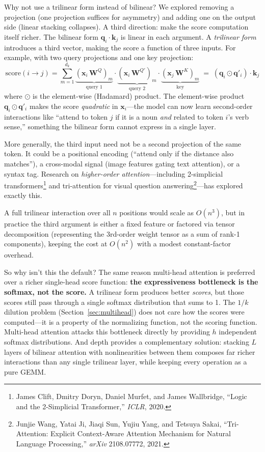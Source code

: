 \begin{whynotbox}{Why not use a trilinear form instead of bilinear?}
We explored removing a projection (one projection suffices for asymmetry) and adding one on the output side (linear stacking collapses). A third direction: make the score computation itself richer. The bilinear form $\mathbf{q}_i \cdot \mathbf{k}_j$ is linear in each argument. A \emph{trilinear form} introduces a third vector, making the score a function of three inputs. For example, with two query projections and one key projection:
\[
\text{score}(i \to j) = \sum_{m=1}^{d_k} \underbrace{(\mathbf{x}_i\, \mathbf{W}^Q)_m}_{\text{query 1}} \cdot \underbrace{(\mathbf{x}_i\, \mathbf{W}^{Q'})_m}_{\text{query 2}} \cdot \underbrace{(\mathbf{x}_j\, \mathbf{W}^K)_m}_{\text{key}} \;=\; (\mathbf{q}_i \odot \mathbf{q}'_i) \cdot \mathbf{k}_j
\]
where $\odot$ is the element-wise (Hadamard) product. The element-wise product $\mathbf{q}_i \odot \mathbf{q}'_i$ makes the score \emph{quadratic} in $\mathbf{x}_i$---the model can now learn second-order interactions like ``attend to token $j$ if it is a noun \emph{and} related to token $i$'s verb sense,'' something the bilinear form cannot express in a single layer.

More generally, the third input need not be a second projection of the same token. It could be a positional encoding (``attend only if the distance also matches''), a cross-modal signal (image features gating text attention), or a syntax tag. Research on \emph{higher-order attention}---including 2-simplicial transformers\footnote{James Clift, Dmitry Doryn, Daniel Murfet, and James Wallbridge, ``Logic and the 2-Simplicial Transformer,'' \emph{ICLR}, 2020.} and tri-attention for visual question answering\footnote{Junjie Wang, Yatai Ji, Jiaqi Sun, Yujiu Yang, and Tetsuya Sakai, ``Tri-Attention: Explicit Context-Aware Attention Mechanism for Natural Language Processing,'' \emph{arXiv} 2108.07772, 2021.}---has explored exactly this.

A full trilinear interaction over all $n$ positions would scale as $O(n^3)$, but in practice the third argument is either a fixed feature or factored via tensor decomposition (representing the 3rd-order weight tensor as a sum of rank-1 components), keeping the cost at $O(n^2)$ with a modest constant-factor overhead.

So why isn't this the default? The same reason multi-head attention is preferred over a richer single-head score function: \textbf{the expressiveness bottleneck is the softmax, not the score.} A trilinear form produces better \emph{scores}, but those scores still pass through a single softmax distribution that sums to 1. The $1/k$ dilution problem (Section~\ref{sec:multihead}) does not care how the scores were computed---it is a property of the normalizing function, not the scoring function. Multi-head attention attacks this bottleneck directly by providing $h$ independent softmax distributions. And depth provides a complementary solution: stacking $L$ layers of bilinear attention with nonlinearities between them composes far richer interactions than any single trilinear layer, while keeping every operation as a pure GEMM.
\end{whynotbox}

